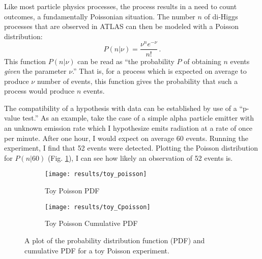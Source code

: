     Like most particle physics processes, the \vbfhhproc process results in a need to count outcomes,
        a fundamentally Poissonian situation.
    The number $n$ of di-Higgs processes that are observed in ATLAS can then be modeled with a Poisson distribution\cite{cranmer2015practical}:
    \begin{equation}
        P(n|\nu) = \frac{ \nu^n e^{-\nu} }{n!}
        \,.
    \end{equation}
    This function $P(n|\nu)$ can be read as ``the probability $P$ of obtaining $n$ events \textit{given} the parameter $\nu$.''
    That is, for a process which is expected on average to produce $\nu$ number of events,
        this function gives the probability that such a process would produce $n$ events.

    The compatibility of a hypothesis with data can be established by use of a ``p-value test.''
    As an example, take the case of a simple alpha particle emitter with an unknown emission rate
        which I hypothesize emits radiation at a rate of once per minute.
    After one hour, I would expect on average 60 events.
    Running the experiment, I find that 52 events were detected.
    Plotting the Poisson distribution for $P(n|60)$ (Fig. \ref{fig:poisson_toy_sig:pdf}),
        I can see how likely an observation of 52 events is.
    \begin{figure}
        \centering
        \begin{subfigure}{0.48\textwidth} 
            \texttt{[image: results/toy\_poisson]}
            \caption{Toy Poisson PDF}
            \label{fig:poisson_toy_sig:pdf}
        \end{subfigure}
        \begin{subfigure}{0.48\textwidth}
            \texttt{[image: results/toy\_Cpoisson]}
            \caption{Toy Poisson Cumulative PDF}
            \label{fig:poisson_toy_sig:Cpdf}
        \end{subfigure}
        \caption{
            A plot of the probability distribution function (PDF)
                and cumulative PDF for a toy Poisson experiment.
        }
    \end{figure}

